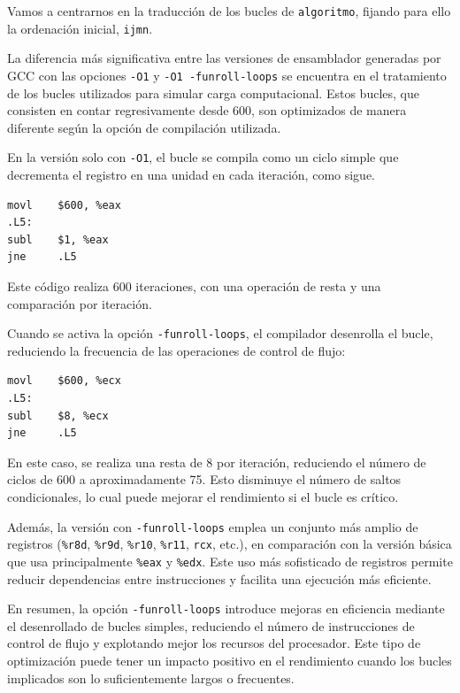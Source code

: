 \documentclass[11pt,a4paper,twoside]{article}
\theoremstyle{definition}
\begin{document}
	Vamos a centrarnos en la traducción de los bucles de \texttt{algoritmo}, fijando para ello la ordenación inicial, \texttt{ijmn}. 
	
	La diferencia más significativa entre las versiones de ensamblador generadas por GCC con las opciones \texttt{-O1} y \texttt{-O1 -funroll-loops} se encuentra en el tratamiento de los bucles utilizados para simular carga computacional. Estos bucles, que consisten en contar regresivamente desde 600, son optimizados de manera diferente según la opción de compilación utilizada.
	
	En la versión solo con \texttt{-O1}, el bucle se compila como un ciclo simple que decrementa el registro en una unidad en cada iteración, como sigue.
	\begin{verbatim}
movl    $600, %eax
.L5:
subl    $1, %eax
jne     .L5
	\end{verbatim}
	
	Este código realiza 600 iteraciones, con una operación de resta y una comparación por iteración.
	
	Cuando se activa la opción \texttt{-funroll-loops}, el compilador desenrolla el bucle, reduciendo la frecuencia de las operaciones de control de flujo:
	
	\begin{verbatim}
movl    $600, %ecx
.L5:
subl    $8, %ecx
jne     .L5
	\end{verbatim}
	
	En este caso, se realiza una resta de 8 por iteración, reduciendo el número de ciclos de 600 a aproximadamente 75. Esto disminuye el número de saltos condicionales, lo cual puede mejorar el rendimiento si el bucle es crítico.
	
	Además, la versión con \texttt{-funroll-loops} emplea un conjunto más amplio de registros (\texttt{\%r8d}, \texttt{\%r9d}, \texttt{\%r10}, \texttt{\%r11}, \texttt{rcx}, etc.), en comparación con la versión básica que usa principalmente \texttt{\%eax} y \texttt{\%edx}. Este uso más sofisticado de registros permite reducir dependencias entre instrucciones y facilita una ejecución más eficiente.
	
	En resumen, la opción \texttt{-funroll-loops} introduce mejoras en eficiencia mediante el desenrollado de bucles simples, reduciendo el número de instrucciones de control de flujo y explotando mejor los recursos del procesador. Este tipo de optimización puede tener un impacto positivo en el rendimiento cuando los bucles implicados son lo suficientemente largos o frecuentes.
											
\end{document}
